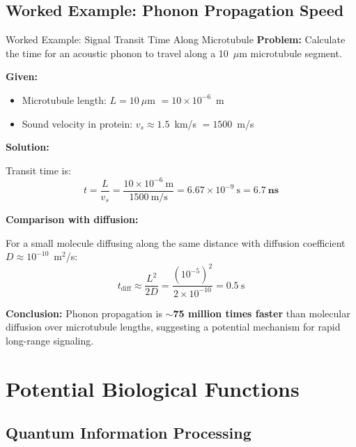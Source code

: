 \subsection{Worked Example: Phonon Propagation Speed}
\label{subsec:worked-example}

\begin{calloutbox}{Worked Example: Signal Transit Time Along Microtubule}
\textbf{Problem:} Calculate the time for an acoustic phonon to travel along a 10~$\mu$m microtubule segment.

\textbf{Given:}
\begin{itemize}
\item Microtubule length: $L = 10~\mu$m $= 10 \times 10^{-6}$~m
\item Sound velocity in protein: $v_s \approx 1.5$~km/s $= 1500$~m/s
\end{itemize}

\textbf{Solution:}

Transit time is:
\begin{equation}
t = \frac{L}{v_s} = \frac{10 \times 10^{-6}~\text{m}}{1500~\text{m/s}} = 6.67 \times 10^{-9}~\text{s} = \mathbf{6.7~\text{ns}}
\end{equation}

\textbf{Comparison with diffusion:}

For a small molecule diffusing along the same distance with diffusion coefficient $D \approx 10^{-10}$~m$^2$/s:
\begin{equation}
t_{\text{diff}} \approx \frac{L^2}{2D} = \frac{(10^{-5})^2}{2 \times 10^{-10}} = 0.5~\text{s}
\end{equation}

\textbf{Conclusion:} Phonon propagation is \textbf{$\sim$75 million times faster} than molecular diffusion over microtubule lengths, suggesting a potential mechanism for rapid long-range signaling.
\end{calloutbox}



\section{Potential Biological Functions}\label{potential-biological-functions-speculative}

\subsection{Quantum Information Processing}\label{quantum-information-processing}

